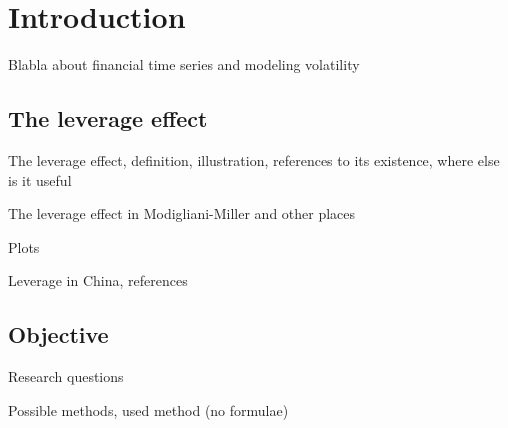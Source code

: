 \section{Introduction}

Blabla about financial time series and modeling volatility

\subsection{The leverage effect}

The leverage effect, definition, illustration, references to its existence, where else is it useful

The leverage effect in Modigliani-Miller and other places

Plots

Leverage in China, references

\subsection{Objective}

Research questions

Possible methods, used method (no formulae)